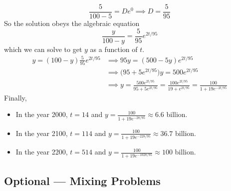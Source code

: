 \begin{eg}
\begin{equation*}
\frac{5}{100-5}=De^{0}
\implies D=\frac{5}{95}
\end{equation*}
So the solution obeys the algebraic equation
\begin{equation*}
 \frac{y}{100-y}=\frac{5}{95}e^{2t/95}
\end{equation*}
which we can solve to get $y$ as a function of $t$.
\begin{align*}
 y=(100-y)\frac{5}{95}e^{2t/95}
     &\implies 95y=(500-5y)e^{2t/95} \\
     &\implies \big(95+5e^{2t/95}\big)y=500 e^{2t/95} \\
     &\implies y=\frac{500e^{2t/95}}{95+5e^{2t/95}}
=\frac{100e^{2t/95}}{19+e^{2t/95}}
=\frac{100}{1+19e^{-2t/95}}
\end{align*}
Finally,
\begin{itemize}\itemsep1pt \parskip0pt  %
\item  In the year 2000, $t=14$ and
                 $y=\frac{100}{1+19e^{-28/95}}\approx6.6$ billion.
\item  In the year 2100, $t=114$ and
                $y=\frac{100}{1+19e^{-228/95}}\approx 36.7$ billion.
\item  In the year 2200, $t=514$ and
                $y=\frac{100}{1+19e^{-1028/95}}\approx 100$ billion.
\end{itemize}
\end{eg}



\subsection{Optional --- Mixing Problems}

